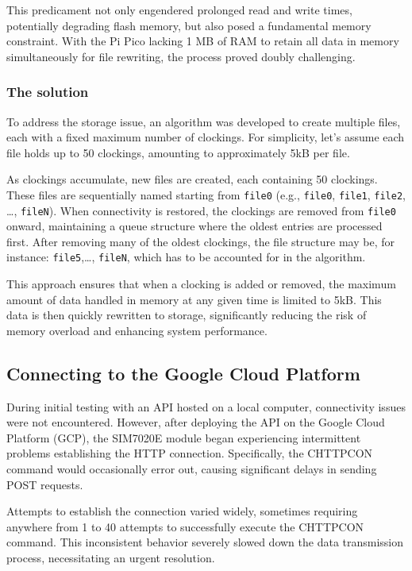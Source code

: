 This predicament not only engendered prolonged read and write times, potentially degrading flash 
memory, but also posed a fundamental memory constraint. With the Pi Pico lacking 1 MB of RAM to 
retain all data in memory simultaneously for file rewriting, the process proved doubly challenging.

\subsubsection*{The solution}

To address the storage issue, an algorithm was developed to create multiple files, each with a 
fixed maximum number of clockings. For simplicity, let's assume each file holds up to 50 
clockings, amounting to approximately 5kB per file.

As clockings accumulate, new files are created, each containing 50 clockings. These files are 
sequentially named starting from \texttt{file0} (e.g., \texttt{file0}, \texttt{file1}, 
\texttt{file2},\\\dots, \texttt{fileN}). When connectivity is restored, the clockings are removed 
from \texttt{file0} onward, maintaining a queue structure where the oldest entries are processed 
first. After removing many of the oldest clockings, the file structure may be, for instance: 
\texttt{file5},\dots, \texttt{fileN}, which has to be accounted for in the algorithm.

This approach ensures that when a clocking is added or removed, the maximum amount of data handled 
in memory at any given time is limited to 5kB. This data is then quickly rewritten to storage, 
significantly reducing the risk of memory overload and enhancing system performance.


\subsection{Connecting to the Google Cloud Platform}

During initial testing with an API hosted on a local computer, connectivity issues were not 
encountered. However, after deploying the API on the Google Cloud Platform (GCP), the SIM7020E 
module began experiencing intermittent problems establishing the HTTP connection. Specifically, the 
CHTTPCON command would occasionally error out, causing significant delays in sending POST requests.

Attempts to establish the connection varied widely, sometimes requiring anywhere from 1 to 40 
attempts to successfully execute the CHTTPCON command. This inconsistent behavior severely slowed 
down the data transmission process, necessitating an urgent resolution.

